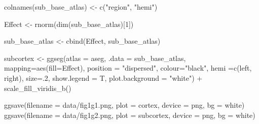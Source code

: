 \documentclass{article}
\newenvironment{Shaded}{\begin{snugshade}}{\end{snugshade}}
\newcommand{\AttributeTok}[1]{\textcolor[rgb]{0.77,0.63,0.00}{#1}}
\newcommand{\DecValTok}[1]{\textcolor[rgb]{0.00,0.00,0.81}{#1}}
\newcommand{\FunctionTok}[1]{\textcolor[rgb]{0.00,0.00,0.00}{#1}}
\newcommand{\NormalTok}[1]{#1}
\newcommand{\OtherTok}[1]{\textcolor[rgb]{0.56,0.35,0.01}{#1}}
\newcommand{\SpecialCharTok}[1]{\textcolor[rgb]{0.00,0.00,0.00}{#1}}
\newcommand{\StringTok}[1]{\textcolor[rgb]{0.31,0.60,0.02}{#1}}
\begin{document}
\begin{Shaded}
\begin{Highlighting}[]
\FunctionTok{colnames}\NormalTok{(sub\_base\_atlas) }\OtherTok{\textless{}{-}} \FunctionTok{c}\NormalTok{(}\StringTok{"region"}\NormalTok{, }\StringTok{"hemi"}\NormalTok{)}

\NormalTok{Effect }\OtherTok{\textless{}{-}} \FunctionTok{rnorm}\NormalTok{(}\FunctionTok{dim}\NormalTok{(sub\_base\_atlas)[}\DecValTok{1}\NormalTok{])}

\NormalTok{sub\_base\_atlas }\OtherTok{\textless{}{-}} \FunctionTok{cbind}\NormalTok{(Effect, sub\_base\_atlas)}

\NormalTok{subcortex }\OtherTok{\textless{}{-}} \FunctionTok{ggseg}\NormalTok{(}\AttributeTok{atlas =}\NormalTok{ aseg,}
                   \AttributeTok{.data =}\NormalTok{ sub\_base\_atlas,}
                   \AttributeTok{mapping=}\FunctionTok{aes}\NormalTok{(}\AttributeTok{fill=}\NormalTok{Effect), }
                   \AttributeTok{position =} \StringTok{"dispersed"}\NormalTok{,}
                   \AttributeTok{colour=}\StringTok{"black"}\NormalTok{,}
                   \AttributeTok{hemi =}\FunctionTok{c}\NormalTok{(}\StringTok{\textquotesingle{}left\textquotesingle{}}\NormalTok{, }\StringTok{\textquotesingle{}right\textquotesingle{}}\NormalTok{),}
                   \AttributeTok{size=}\NormalTok{.}\DecValTok{2}\NormalTok{,}
                   \AttributeTok{show.legend =}\NormalTok{ T, }
                   \AttributeTok{plot.background =} \StringTok{"white"}\NormalTok{) }\SpecialCharTok{+} 
  \FunctionTok{scale\_fill\_viridis\_b}\NormalTok{() }

\FunctionTok{ggsave}\NormalTok{(}\AttributeTok{filename =} \StringTok{\textquotesingle{}data/fig1g1.png\textquotesingle{}}\NormalTok{, }\AttributeTok{plot =}\NormalTok{ cortex, }\AttributeTok{device =} \StringTok{\textquotesingle{}png\textquotesingle{}}\NormalTok{, }\AttributeTok{bg =} \StringTok{\textquotesingle{}white\textquotesingle{}}\NormalTok{)}
\FunctionTok{ggsave}\NormalTok{(}\AttributeTok{filename =} \StringTok{\textquotesingle{}data/fig1g2.png\textquotesingle{}}\NormalTok{, }\AttributeTok{plot =}\NormalTok{ subcortex, }\AttributeTok{device =} \StringTok{\textquotesingle{}png\textquotesingle{}}\NormalTok{, }\AttributeTok{bg =} \StringTok{\textquotesingle{}white\textquotesingle{}}\NormalTok{)}
\end{Highlighting}
\end{Shaded}
\end{document}
